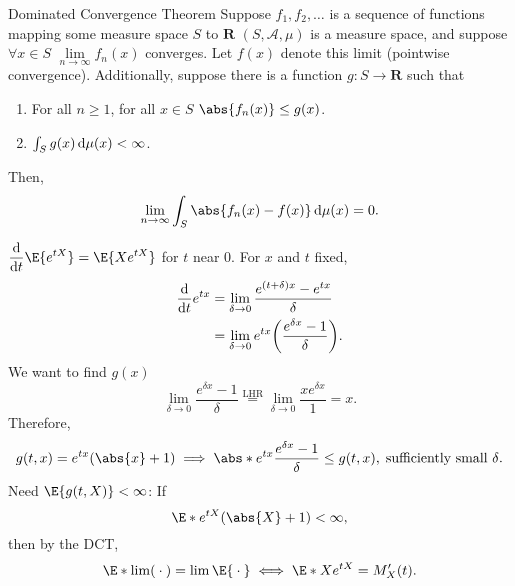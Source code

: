 \begin{Theorem}{Dominated Convergence Theorem}{}
    Suppose $ f_1,f_2,\ldots $ is a sequence of functions
    mapping some measure space $ S $ to $ \mathbf{R} $ $
        (S,\mathcal{A},\mu) $ is a measure space, and suppose $
        \forall x\in S $ $ \lim\limits_{{n} \to {\infty}}f_n(x)
    $ converges. Let $ f(x) $ denote this limit (pointwise
    convergence). Additionally, suppose there is a function
    $ g\colon S\to\mathbf{R} $ such that
    \begin{enumerate}[(1)]
        \item For all $ n\ge 1 $, for all $ x\in S $ $
                  \abs{f_n(x)}\le g(x) $.
        \item $ \int_{S}^{}g(x)\odif{\mu(x)}<\infty $.
    \end{enumerate}
    Then,
    \[ \lim\limits_{{n} \to
            {\infty}}\int_{S}^{}\abs{f_n(x)-f(x)}\odif{\mu(x)} =0.
    \]
\end{Theorem}
\begin{Proposition}{}{}
    $ \displaystyle \odv*{\E{e^{tX}}}{t}=\E{Xe^{tX}} $ for $
        t $ near $ 0 $.
    \tcblower{}
    For $ x $ and $ t $ fixed,
    \begin{align*}
        \odv*{e^{tx}}{t}
         & =\lim\limits_{{\delta} \to {0}}\frac{e^{(t+\delta)x}-e^{tx}}{\delta} \\
         & =\lim\limits_{{\delta} \to {0}}e^{tx}
        \biggl(\frac{e^{\delta x}-1}{\delta}\biggr).
    \end{align*}
    We want to find $ g(x) $
    \[ \lim\limits_{{\delta} \to {0}}\frac{e^{\delta
                    x}-1}{\delta}
        \stackrel{\text{LHR}}{=}\lim\limits_{{\delta} \to
            {0}}\frac{xe^{\delta x}}{1}=x. \] Therefore,
    \[ g(t,x)=e^{tx}(\abs{x}+1)\implies
        \abs*{e^{tx}\frac{e^{\delta x}-1}{\delta}}\le g(t,x),\;
        \text{sufficiently small $ \delta $}. \] Need $
        \E{g(t,X)}<\infty $: If
    \[ \E*{e^{tX}(\abs{X}+1)}< \infty, \] then by the DCT,
    \[ \E*{\lim(\:\cdot\:)}=\lim\E{\:\cdot\:} \iff \E*{X
            e^{tX}}=M_X'(t). \]
\end{Proposition}
